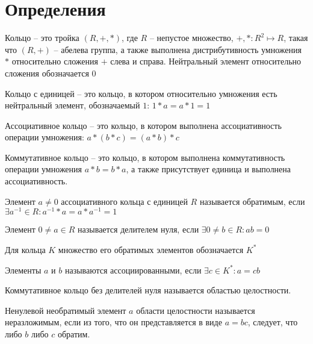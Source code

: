 \documentclass{article}
\begin{document}
%
%
%
%

\section{Определения}

\begin{definition}
    Кольцо -- это тройка $(R, +, *)$, где $R$ -- непустое множество, $+, *: R^2 \mapsto R$, такая что $(R, +)$ --
    абелева группа, а также выполнена дистрибутивность умножения $*$ относительно сложения $+$ слева и справа.
    Нейтральный элемент относительно сложения обозначается $0$

    Кольцо с единицей -- это кольцо, в котором относительно умножения есть нейтральный элемент, обозначаемый $1$: $1*a =
    a*1 = 1$

    Ассоциативное кольцо -- это кольцо, в котором выполнена ассоциативность операции умножения: $a*(b*c) = (a*b)*c$

    Коммутативное кольцо -- это кольцо, в котором выполнена коммутативность операции умножения $a*b = b*a$, а также
    присутствует единица и выполнена ассоциативность.
\end{definition}

\begin{definition}
    Элемент $a \neq 0$ ассоциативного кольца с единицей $R$ называется обратимым, если $\exists a^{-1} \in  R: a^{-1} *
    a = a * a^{-1} = 1$
\end{definition}

\begin{definition}
    Элемент $0 \neq a \in R$ называется делителем нуля, если $\exists 0 \neq b \in R: ab = 0$
\end{definition}

\begin{definition}
    Для кольца $K$ множество его обратимых элементов обозначается $K^*$

    Элементы $a$ и $b$ называются ассоциированными, если $\exists c \in K^*: a = cb$
\end{definition}

\begin{definition}
    Коммутативное кольцо без делителей нуля называется областью целостности.
\end{definition}

\begin{definition}
    Ненулевой необратимый элемент $a$ области целостности называется неразложимым, если из того, что он представляется в
    виде $a = bc$, следует, что либо $b$ либо $c$ обратим.
\end{definition}
\end{document}

